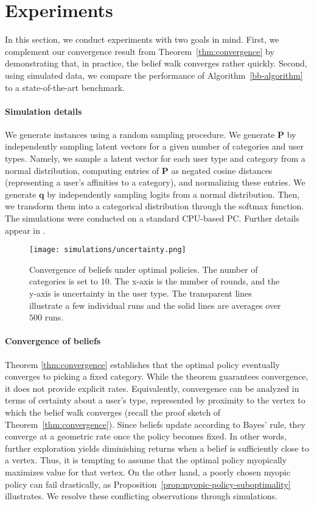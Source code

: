 \section{Experiments}\label{sec:experiments}

In this section, we conduct experiments with two goals in mind. First, we complement our convergence result from Theorem~\ref{thm:convergence} by demonstrating that, in practice, the belief walk converges rather quickly. Second, using simulated data, we compare the performance of Algorithm~\ref{bb-algorithm} to a state-of-the-art benchmark. 

\paragraph{Simulation details}
We generate instances using a random sampling procedure. We generate $\bm P$ by independently sampling latent vectors for a given number of categories and user types. Namely, we sample a latent vector for each user type and category from a normal distribution, computing entries of $\bm P$ as negated cosine distances (representing a user's affinities to a category), and normalizing these entries. We generate $\bm q$ by independently sampling logits from a normal distribution. Then, we transform them into a categorical distribution through the softmax function. 
The simulations were conducted on a standard CPU-based PC. Further details appear in . 

\begin{figure}
   \centering
   \texttt{[image: simulations/uncertainty.png]}
   \caption{Convergence of beliefs under optimal policies. The number of categories is set to $10$. The x-axis is the number of rounds, and the y-axis is uncertainty in the user type. The transparent lines illustrate a few individual runs and the solid lines are averages over $500$ runs.}
   \label{fig:uncertainty}
\end{figure}

\paragraph{Convergence of beliefs}
Theorem \ref{thm:convergence} establishes that the optimal policy eventually converges to picking a fixed category. While the theorem guarantees convergence, it does not provide explicit rates. Equivalently, convergence can be analyzed in terms of certainty about a user's type, represented by proximity to the vertex to which the belief walk converges (recall the proof sketch of Theorem~\ref{thm:convergence}). Since beliefs update according to Bayes' rule, they converge at a geometric rate once the policy becomes fixed. In other words, further exploration yields diminishing returns when a belief is sufficiently close to a vertex. Thus, it is tempting to assume that the optimal policy myopically maximizes value for that vertex. On the other hand, a poorly chosen myopic policy can fail drastically, as Proposition~\ref{prop:myopic-policy-suboptimality} illustrates. We resolve these conflicting observations through simulations.

